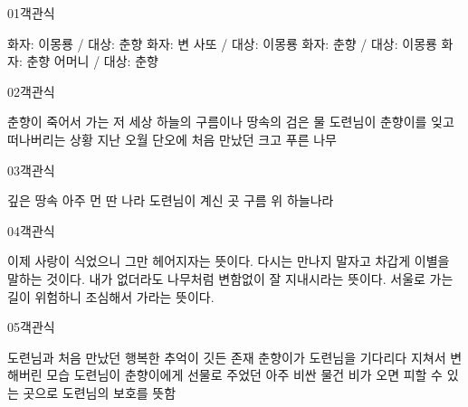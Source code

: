 \documentclass[fs95,seriesFre]{korfarm-base}
\begin{document}

\begin{kfQBlock}{01}{객관식}
\begin{kfChoices}
\kfChoice 화자: 이몽룡 / 대상: 춘향
\kfChoice 화자: 변 사또 / 대상: 이몽룡
\kfChoice 화자: 춘향 / 대상: 이몽룡
\kfChoice 화자: 춘향 어머니 / 대상: 춘향
\end{kfChoices}
\end{kfQBlock}
\begin{kfQBlock}{02}{객관식}
\begin{kfChoices}
\kfChoice 춘향이 죽어서 가는 저 세상
\kfChoice 하늘의 구름이나 땅속의 검은 물
\kfChoice 도련님이 춘향이를 잊고 떠나버리는 상황
\kfChoice 지난 오월 단오에 처음 만났던 크고 푸른 나무
\end{kfChoices}
\end{kfQBlock}
\begin{kfQBlock}{03}{객관식}
\begin{kfChoices}
\kfChoice 깊은 땅속
\kfChoice 아주 먼 딴 나라
\kfChoice 도련님이 계신 곳
\kfChoice 구름 위 하늘나라
\end{kfChoices}
\end{kfQBlock}
\begin{kfQBlock}{04}{객관식}
\begin{kfChoices}
\kfChoice 이제 사랑이 식었으니 그만 헤어지자는 뜻이다.
\kfChoice 다시는 만나지 말자고 차갑게 이별을 말하는 것이다.
\kfChoice 내가 없더라도 나무처럼 변함없이 잘 지내시라는 뜻이다.
\kfChoice 서울로 가는 길이 위험하니 조심해서 가라는 뜻이다.
\end{kfChoices}
\end{kfQBlock}
\begin{kfQBlock}{05}{객관식}
\begin{kfChoices}
\kfChoice 도련님과 처음 만났던 행복한 추억이 깃든 존재
\kfChoice 춘향이가 도련님을 기다리다 지쳐서 변해버린 모습
\kfChoice 도련님이 춘향이에게 선물로 주었던 아주 비싼 물건
\kfChoice 비가 오면 피할 수 있는 곳으로 도련님의 보호를 뜻함
\end{kfChoices}
\end{kfQBlock}
\end{document}
